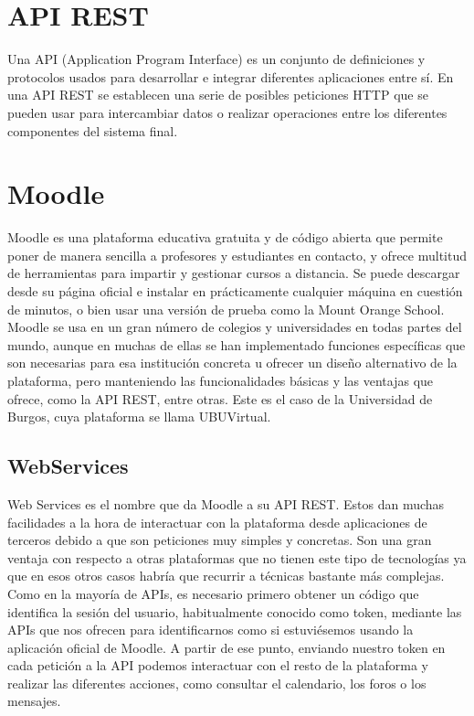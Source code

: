 
\section{API REST}
Una API (Application Program Interface) es un conjunto de definiciones y protocolos usados para desarrollar e integrar diferentes aplicaciones entre sí. En una API REST se establecen una serie de posibles peticiones HTTP que se pueden usar para intercambiar datos o realizar operaciones entre los diferentes componentes del sistema final.

\section{Moodle}
Moodle es una plataforma educativa gratuita y de código abierta que permite poner de manera sencilla a profesores y estudiantes en contacto, y ofrece multitud de herramientas para impartir y gestionar cursos a distancia. Se puede descargar desde su página oficial e instalar en prácticamente cualquier máquina en cuestión de minutos, o bien usar una versión de prueba como la Mount Orange School.
Moodle se usa en un gran número de colegios y universidades en todas partes del mundo, aunque en muchas de ellas se han implementado funciones específicas que son necesarias para esa institución concreta u ofrecer un diseño alternativo de la plataforma, pero manteniendo las funcionalidades básicas y las ventajas que ofrece, como la API REST, entre otras.
Este es el caso de la Universidad de Burgos, cuya plataforma se llama UBUVirtual.
\subsection{WebServices}
Web Services es el nombre que da Moodle a su API REST. Estos dan muchas facilidades a la hora de interactuar con la plataforma desde aplicaciones de terceros debido a que son peticiones muy simples y concretas. Son una gran ventaja con respecto a otras plataformas que no tienen este tipo de tecnologías ya que en esos otros casos habría que recurrir a técnicas bastante más complejas.
Como en la mayoría de APIs, es necesario primero obtener un código que identifica la sesión del usuario, habitualmente conocido como token, mediante las APIs que nos ofrecen para identificarnos como si estuviésemos usando la aplicación oficial de Moodle. A partir de ese punto, enviando nuestro token en cada petición a la API podemos interactuar con el resto de la plataforma y realizar las diferentes acciones, como consultar el calendario, los foros o los mensajes.


